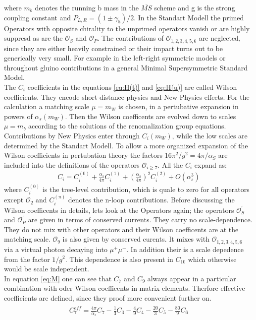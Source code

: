\documentclass[english]{uzhpub}
\begin{document}
where $m_b$ denotes the running b mass in the $\overline{MS}$ scheme and g is the strong coupling constant and $P_{L,R} = ( 1 \pm \gamma_5)/2$. In the Standart Modell the primed Operators with opposite chirality to the unprimed operators vanish or are highly suppresd as are the $\mathcal{O}_S$ and $\mathcal{O}_P$. The contributions of $\mathcal{O}_{1,2,3,4,5,6}$ are neglected, since they are either heavily constrained or their impact turns out to be generically very small. For example in the left-right symmetric models or throughout gluino contributions in a general Minimal Supersymmetric Standard Model. \\
The $C_i$ coefficients in the equations \ref{eq:H(t)} and \ref{eq:H(u)} are called Wilson coefficients. They encode short-distance physics and New Physics effects. For the calculation a matching scale $\mu = m_W$ is chosen, in a pertubative expansion in powers of $\alpha_s (m_W)$. Then the Wilson coefficents are evolved down to scales $\mu = m_b$ according to the solutions of the renomalization group equations. Contributions by New Physics enter through $C_i(m_W)$, while the low scales are determined by the Standart Modell. To allow a more organized expansion of the Wilson coefficients in pertubation theory the factors $16 \pi^2 / g^2 = 4 \pi / \alpha_S$ are included into the definitions of the operators $\mathcal{O}_{i \geq 7}$. All the $C_i$ expand as:
\begin{align}
  C_i = C_i^{(0)} + \frac{\alpha_s}{4 \pi} C_i^{(1)} + \left( \frac{\alpha_s}{4 \pi} \right)^2 C_i^{(2)} + O(\alpha_s^3)
\end{align}
where $C_i^{(0)}$ is the tree-level contribution, which is quale to zero for all operators except $\mathcal{O}_2$ and $C_i^{(n)}$ denotes the n-loop contributions.
Before discussing the Wilson coefficents in details, lets look at the Operators again; the operators $\mathcal{O}_S^\prime$ and $\mathcal{O}_P^\prime$ are given in terms of conserved currents. They carry no scale-dependence. They do not mix with other operators and their Wilson coefficents are at the matching scale. $\mathcal{O}_9$ is also given by conserved curents. It mixes with $\mathcal{O}_{1,2,3,4,5,6}$ via a virtual photon decaying into $\mu^+ \mu^-$. In addition their is a scale depedence from the factor $1/g^2$. This dependence is also present in $C_{10}$ which otherwise would be scale independent. \\
In equation \ref{eq:M} one can see that $C_7$ and $C_9$ always appear in a particular combination with oder Wilson coefficents in matrix elements. Therfore effective coefficients are defined, since they proof more convenient further on.
 \begin{align}
   \begin{split}
     C_7^{eff} = \frac{4 \pi}{\alpha_s} C_7 - \frac{1}{3} C_3 - \frac{4}{9} C_4 - \frac{20}{3} C_5 - \frac{80}{9} C_6
   \end{split}
 \end{align}
\end{document}
